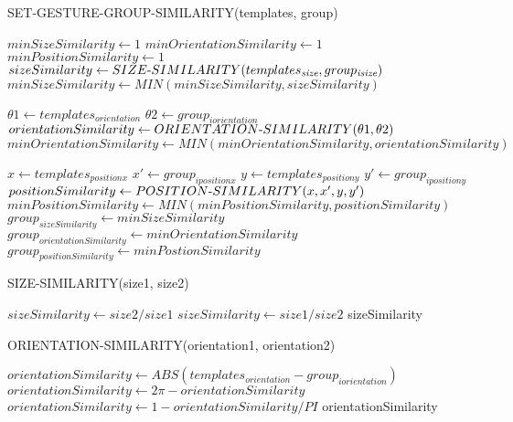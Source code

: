 \begin{algorithm}
  \caption*{SET-GESTURE-GROUP-SIMILARITY(templates, group)}
  \begin{algorithmic}[1]
  \State $minSizeSimilarity\gets 1$
   \State $minOrientationSimilarity\gets 1$
    \State $minPositionSimilarity\gets 1$
	\State $sizeSimilarity\gets SIZE\mathchar`-SIMILARITY(templates_\textit{size}, group_\textit{isize})$
	\State $minSizeSimilarity\gets MIN(minSizeSimilarity, sizeSimilarity)$
	
	\State $\theta 1\gets templates_\textit{orientation}$
	\State $\theta 2\gets group_\textit{iorientation}$
	\State $orientationSimilarity\gets ORIENTATION\mathchar`-SIMILARITY(\theta 1, \theta 2)$
	\State $minOrientationSimilarity\gets MIN(minOrientationSimilarity, orientationSimilarity)$
	
	\State $x\gets templates_\textit{positionx}$
	\State $x'\gets group_\textit{ipositionx}$
	\State $y\gets templates_\textit{positiony}$
	\State $y'\gets group_\textit{ipositiony}$
	\State $positionSimilarity\gets POSITION\mathchar`-SIMILARITY(x, x', y, y')$
	\State $minPositionSimilarity\gets MIN(minPositionSimilarity, positionSimilarity)$
  \EndFor
  \State $group_\textit{sizeSimilarity}\gets minSizeSimilarity$
  \State $group_\textit{orientationSimilarity}\gets minOrientationSimilarity$
  \State $group_\textit{positionSimilarity}\gets minPostionSimilarity$
\end{algorithmic}
\end{algorithm}

\begin{algorithm}
  \caption*{SIZE-SIMILARITY(size1, size2)}
  \begin{algorithmic}[1]
 		 \State $sizeSimilarity\gets size2 / size1$
	\ElsIf
		\State $sizeSimilarity\gets size1 / size2$
	\EndIf
   \Return sizeSimilarity
\end{algorithmic}
\end{algorithm}

\begin{algorithm}
  \caption*{ORIENTATION-SIMILARITY(orientation1, orientation2)}
  \begin{algorithmic}[1]
  \State $orientationSimilarity\gets ABS(templates_\textit{orientation} - group_\textit{iorientation})$
		\State $orientationSimilarity\gets 2\pi - orientationSimilarity$
	\EndIf
	\State $orientationSimilarity\gets 1 - orientationSimilarity / PI$
    \Return orientationSimilarity
\end{algorithmic}
\end{algorithm}

